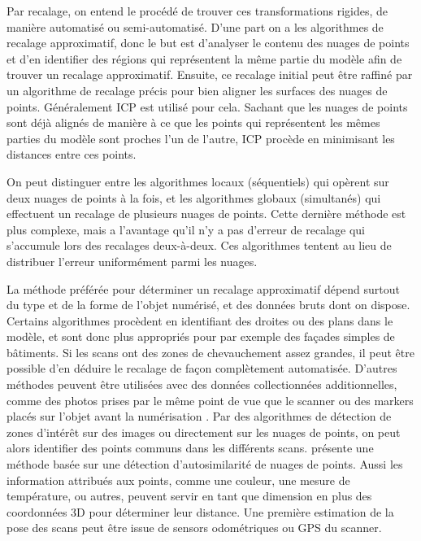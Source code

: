 \documentclass[a4paper,10pt]{scrreprt}
\begin{document}
Par recalage, on entend le procédé de trouver ces transformations rigides, de manière automatisé ou semi-automatisé. D'une part on a les algorithmes de recalage approximatif, donc le but est d'analyser le contenu des nuages de points et d'en identifier des régions qui représentent la même partie du modèle afin de trouver un recalage approximatif. Ensuite, ce recalage initial peut être raffiné par un algorithme de recalage précis pour bien aligner les surfaces des nuages de points. Généralement ICP est utilisé pour cela. Sachant que les nuages de points sont déjà alignés de manière à ce que les points qui représentent les mêmes parties du modèle sont proches l'un de l'autre, ICP procède en minimisant les distances entre ces points.

On peut distinguer entre les algorithmes locaux (séquentiels) qui opèrent sur deux nuages de points à la fois, et les algorithmes globaux (simultanés) qui effectuent un recalage de plusieurs nuages de points. Cette dernière méthode est plus complexe, mais a l'avantage qu'il n'y a pas d'erreur de recalage qui s'accumule lors des recalages deux-à-deux. Ces algorithmes tentent au lieu de distribuer l'erreur uniformément parmi les nuages.

La méthode préférée pour déterminer un recalage approximatif dépend surtout du type et de la forme de l'objet numérisé, et des données bruts dont on dispose. Certains algorithmes procèdent en identifiant des droites \cite{Lich2011} ou des plans \cite{Dold2006} dans le modèle, et sont donc plus appropriés pour par exemple des façades simples de bâtiments. Si les scans ont des zones de chevauchement assez grandes, il peut être possible d'en déduire le recalage de façon complètement automatisée. D'autres méthodes peuvent être utilisées avec des données collectionnées additionnelles, comme des photos prises par le même point de vue que le scanner \cite{Tour2009} ou des markers placés sur l'objet avant la numérisation \cite{Mati2011}. Par des algorithmes de détection de zones d'intérêt \cite{Tuyt2007} sur des images ou directement sur les nuages de points, on peut alors identifier des points communs dans les différents scans. \cite{Huan2012} présente une méthode basée sur une détection d'autosimilarité de nuages de points. Aussi les information attribués aux points, comme une couleur, une mesure de température, ou autres, peuvent servir en tant que dimension en plus des coordonnées 3D pour déterminer leur distance. Une première estimation de la pose des scans peut être issue de sensors odométriques ou GPS du scanner.
\end{document}
